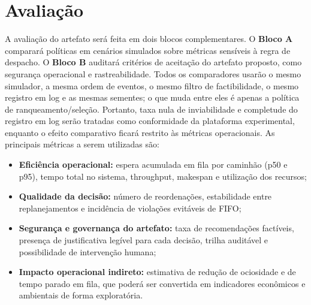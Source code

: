 \documentclass[
  12pt,
  oneside,
  a4paper,
  sumario=tradicional,
  brazil
]{abntex2}
\begin{document}
\chapter{Avaliação}
A avalia\c{c}\~ao do artefato ser\'a feita em dois blocos complementares. O \textbf{Bloco A} comparar\'a pol\'iticas em cen\'arios simulados sobre m\'etricas sens\'iveis \`a regra de despacho. O \textbf{Bloco B} auditar\'a crit\'erios de aceita\c{c}\~ao do artefato proposto, como seguran\c{c}a operacional e rastreabilidade. Todos os comparadores usar\~ao o mesmo simulador, a mesma ordem de eventos, o mesmo filtro de factibilidade, o mesmo registro em log e as mesmas sementes; o que muda entre eles \'e apenas a pol\'itica de ranqueamento/sele\c{c}\~ao. Portanto, taxa nula de inviabilidade e completude do registro em log ser\~ao tratadas como conformidade da plataforma experimental, enquanto o efeito comparativo ficar\'a restrito \`as m\'etricas operacionais. As principais m\'etricas a serem utilizadas s\~ao:
\begin{itemize}[leftmargin=1.27cm,itemsep=0pt,topsep=0pt,parsep=0pt,partopsep=0pt]
  \item \textbf{Efici\^encia operacional:} espera acumulada em fila por caminh\~ao (p50 e p95), tempo total no sistema, throughput, makespan e utiliza\c{c}\~ao dos recursos;
  \item \textbf{Qualidade da decis\~ao:} n\'umero de reordena\c{c}\~oes, estabilidade entre replanejamentos e incid\^encia de viola\c{c}\~oes evit\'aveis de FIFO;
  \item \textbf{Seguran\c{c}a e governan\c{c}a do artefato:} taxa de recomenda\c{c}\~oes fact\'iveis, presen\c{c}a de justificativa leg\'ivel para cada decis\~ao, trilha audit\'avel e possibilidade de interven\c{c}\~ao humana;
  \item \textbf{Impacto operacional indireto:} estimativa de redu\c{c}\~ao de ociosidade e de tempo parado em fila, que poder\'a ser convertida em indicadores econ\^omicos e ambientais de forma explorat\'oria.
\end{itemize}
\end{document}
